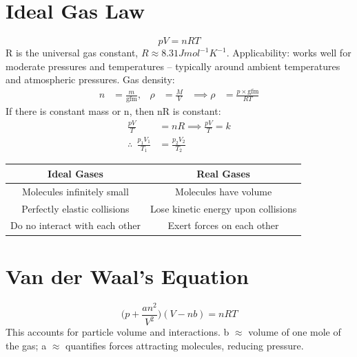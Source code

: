 \documentclass[a4paper, 11pt, normalem]{report}
\begin{document}
\section{Ideal Gas Law}
\begin{equation}
	pV = nRT
\end{equation}
R is the universal gas constant, $R \approx 8.31 J mol^{-1} K^{-1}$.
Applicability: works well for moderate pressures and temperatures -- typically around ambient temperatures and atmospheric pressures.
Gas density:
\begin{align}
    n &= \frac{m}{\text{gfm}}, & \rho &= \frac{M}{V} & \implies \rho &= \frac{p\times\text{gfm}}{RT}
\end{align}
If there is constant mass or n, then nR is constant:
\begin{align}
    \frac{pV}{T} &= nR \implies \frac{pV}{T} = k \\
    \therefore ~~\frac{p_{1}V_{1}}{T_{1}} &= \frac{p_{2}V_{2}}{T_{2}}
\end{align}
\begin{table}[H]
    \centering
    \begin{tabular}{c|c}
    	\hline\hline
    	\bfseries Ideal Gases &\bfseries Real Gases \\
    	\hline\hline
    	Molecules infinitely small & Molecules have volume \\
    	Perfectly elastic collisions & Lose kinetic energy upon collisions \\
    	Do no interact with each other & Exert forces on each other\\
    	\hline\hline
    \end{tabular}
\end{table}

\section{Van der Waal's Equation}
\begin{equation}
	\Big(p+\frac{an^{2}}{V^{2}}\Big)(V-nb) = nRT
\end{equation}
This accounts for particle volume and interactions. 
b $\approx$ volume of one mole of the gas;
a $\approx$ quantifies forces attracting molecules, reducing pressure.
\end{document}
